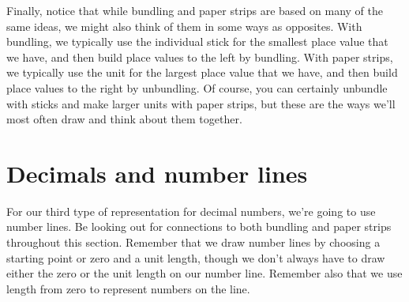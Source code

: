 \documentclass{ximera}
\begin{document}
Finally, notice that while bundling and paper strips are based on many of the same ideas, we might also think of them in some ways as opposites. With bundling, we typically use the individual stick for the smallest place value that we have, and then build place values to the left by bundling. With paper strips, we typically use the unit for the largest place value that we have, and then build place values to the right by unbundling. Of course, you can certainly unbundle with sticks and make larger units with paper strips, but these are the ways we'll most often draw and think about them together.



\section{Decimals and number lines}

For our third type of representation for decimal numbers, we're going to use number lines. Be looking out for connections to both bundling and paper strips throughout this section. Remember that we draw number lines by choosing a starting point or zero and a unit length, though we don't always have to draw either the zero or the unit length on our number line. Remember also that we use length from zero to represent numbers on the line. 
\end{document}
